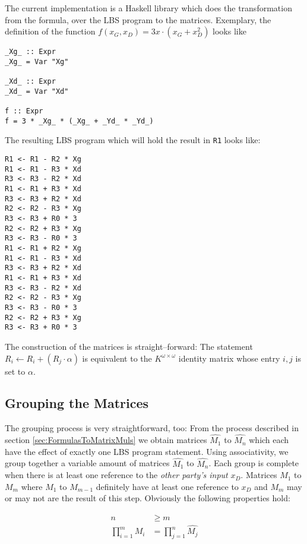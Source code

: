 \documentclass[12pt, a4paper]{article}
\begin{document}
The current implementation is a Haskell library which does the transformation
from the formula, over the LBS program to the matrices. Exemplary,
the definition of the function $f(x_G,x_D) = 3x \cdot (x_G + x_D^2)$ looks like

\lstset{language=Haskell}

\begin{lstlisting}
_Xg_ :: Expr
_Xg_ = Var "Xg"

_Xd_ :: Expr
_Xd_ = Var "Xd"

f :: Expr
f = 3 * _Xg_ * (_Xg_ + _Yd_ * _Yd_)
\end{lstlisting}

\noindent{}The resulting LBS program which will hold the result in \texttt{R1}
looks like:

\begin{lstlisting}
R1 <- R1 - R2 * Xg
R1 <- R1 - R3 * Xd
R3 <- R3 - R2 * Xd
R1 <- R1 + R3 * Xd
R3 <- R3 + R2 * Xd
R2 <- R2 - R3 * Xg
R3 <- R3 + R0 * 3
R2 <- R2 + R3 * Xg
R3 <- R3 - R0 * 3
R1 <- R1 + R2 * Xg
R1 <- R1 - R3 * Xd
R3 <- R3 + R2 * Xd
R1 <- R1 + R3 * Xd
R3 <- R3 - R2 * Xd
R2 <- R2 - R3 * Xg
R3 <- R3 - R0 * 3
R2 <- R2 + R3 * Xg
R3 <- R3 + R0 * 3
\end{lstlisting}

\noindent{}The construction of the matrices is straight--forward: The statement
$R_i \leftarrow R_i + (R_j \cdot \alpha)$ is equivalent to the $K^{\omega \times
\omega}$ identity matrix whose entry $i,j$ is set to $\alpha$.


\subsection{Grouping the Matrices}
\label{sec:matrix-grouping}

The grouping process is very straightforward, too: From the process described in
section \ref{sec:FormulasToMatrixMuls} we obtain matrices $\widehat{M_1}$ to
$\widehat{M_n}$ which each have the effect of exactly one LBS program statement.
Using associativity, we group together a variable amount of matrices
$\widehat{M_1}$ to $\widehat{M_n}$. Each group is complete when there is at
least one reference to the \emph{other party's input} $x_D$.  Matrices $M_1$ to
$M_m$ where $M_1$ to $M_{m-1}$ definitely have at least one reference to $x_D$
and $M_m$ may or may not are the result of this step.  Obviously the following
properties hold:

\begin{align*}
n & \geq m \\
\prod_{i=1}^m M_i & = \prod_{j=1}^n \widehat{M_j}
\end{align*}
\end{document}
